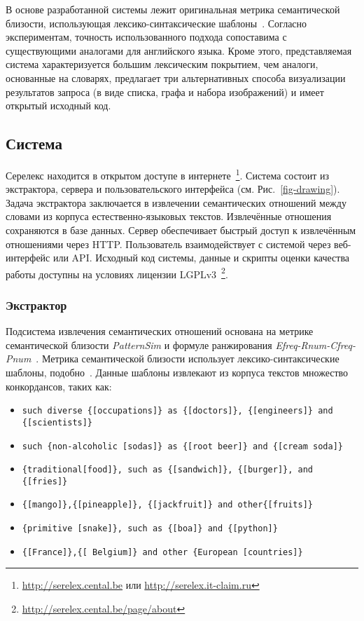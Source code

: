 \documentclass[a4paper,10pt,twoside]{article}
\begin{document}
В основе разработанной системы лежит оригинальная метрика семантической близости, использующая лексико-синтаксические шаблоны~\cite{panchenko2012konvens}. Согласно экспериментам, точность использованного подхода сопоставима с существующими аналогами для английского языка. Кроме этого, представляемая система характеризуется большим лексическим покрытием, чем аналоги, основанные на словарях, предлагает три альтернативных способа визуализации результатов запроса (в виде списка, графа и набора изображений) и имеет открытый исходный код.

\subsection{Система}

Серелекс находится в открытом доступе в интернете~\footnote{\url{http://serelex.cental.be} или \url{http://serelex.it-claim.ru} }.
Система состоит из экстрактора, сервера и пользовательского интерфейса (см. Рис.~\ref{fig-drawing}). Задача экстрактора заключается в извлечении семантических отношений между словами из корпуса естественно-языковых текстов. Извлечённые отношения сохраняются в базе данных. Сервер обеспечивает быстрый доступ к извлечённым отношениями через HTTP. Пользователь взаимодействует с системой через веб-интерфейс или API. Исходный код системы, данные и скрипты оценки качества работы доступны на условиях лицензии LGPLv3~\footnote{ \url{http://serelex.cental.be/page/about} }.


\subsubsection{Экстрактор} Подсистема извлечения семантических отношений основана на метрике семантической близости \textit{PatternSim} и формуле ранжирования \textit{Efreq-Rnum-Cfreq-Pnum}~\cite{panchenko2012konvens}. Метрика семантической близости использует лексико-синтаксические шаблоны, подобно~\cite{hearst1992}. Данные шаблоны извлекают из корпуса текстов множество конкордансов, таких как: 

\begin{itemize}
\footnotesize
\item \texttt{such diverse \{[occupations]\} as \{[doctors]\}, \{[engineers]\} and \{[scientists]\}}

\item \texttt{such \{non-alcoholic [sodas]\} as \{[root beer]\} and \{[cream 
 soda]\}}
 
\item \texttt{\{traditional[food]\}, such as \{[sandwich]\}, \{[burger]\}, and \{[fries]\}}

\item \texttt{\{[mango]\},\{[pineapple]\}, \{[jackfruit]\} and other\{[fruits]\}}

\item \texttt{\{primitive [snake]\}, such as \{[boa]\} and \{[python]\}}
\item \texttt{\{[France]\},\{[ Belgium]\} and other \{European [countries]\}}
\end{itemize}
\end{document}
